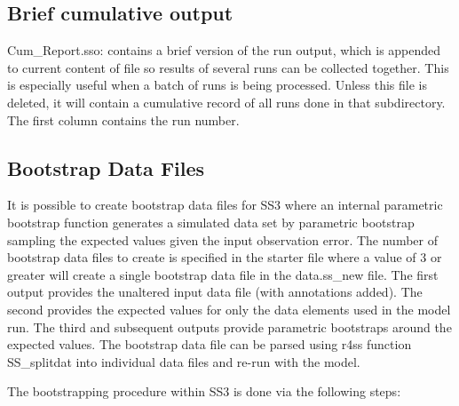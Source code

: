 \subsection{Brief cumulative output}
Cum\_Report.sso: contains a brief version of the run output, which is appended to current content of file so results of several runs can be collected together. This is especially useful when a batch of runs is being processed. Unless this file is deleted, it will contain a cumulative record of all runs done in that subdirectory. The first column contains the run number.  

\hypertarget{bootstrap}{}
\subsection{Bootstrap Data Files}
It is possible to create bootstrap data files for SS3 where an internal parametric bootstrap function generates a simulated data set by parametric bootstrap sampling the expected values given the input observation error. The number of bootstrap data files to create is specified in the starter file where a value of 3 or greater will create a single bootstrap data file in the data.ss\_new file. The first output provides the unaltered input data file (with annotations added).  The second provides the expected values for only the data elements used in the model run.  The third and subsequent outputs provide parametric bootstraps around the expected values. The bootstrap data file can be parsed using r4ss function SS\_splitdat into individual data files and re-run with the model.

The bootstrapping procedure within SS3 is done via the following steps:

